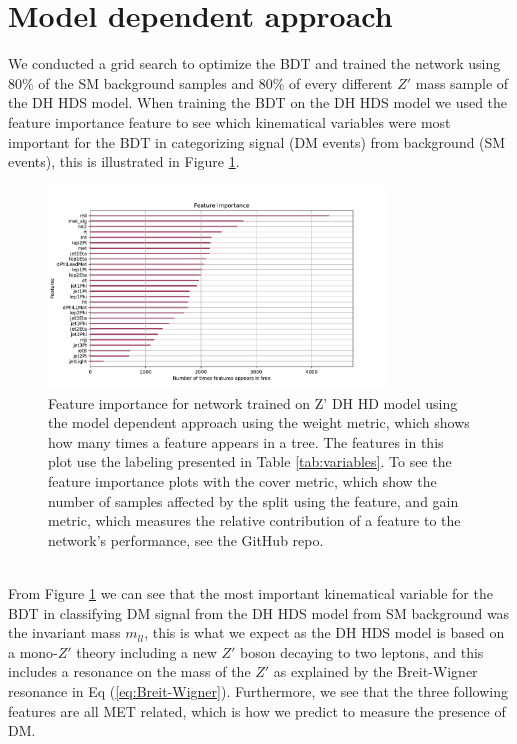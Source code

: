 \documentclass[12pt, a4paper]{book}
\begin{document}
\graphicspath{{../../../Plots/}}
\section{Model dependent approach}\label{sec:Walkthrough}
We conducted a grid search to optimize the BDT and trained the network using 80\% of the SM background samples and 80\% of every different $Z'$ mass sample of the DH HDS model. When training the BDT on the DH HDS model we used the feature importance feature to see which kinematical variables were most important for the BDT in 
categorizing signal (DM events) from background (SM events), this is illustrated in Figure \ref{fig:DH_HDS_feat}. 
\begin{figure}[!ht]
	\centering
      \includegraphics[width=0.8\textwidth]{XGBoost/DH_HDS/feature_importance/weight.pdf}
   \caption[Feature importance for network trained on Z' DH HD model using the model dependent approach]{Feature importance for network trained on Z' DH HD model using the model dependent approach using the weight metric, which shows how many times a feature appears in a tree. The features in this plot use the labeling presented in Table \ref{tab:variables}. 
   To see the feature importance plots with the cover metric, which show the number of samples affected by the split using the feature, and gain metric, which measures the relative contribution of a feature to the network's performance, see the GitHub repo.}\label{fig:DH_HDS_feat}
\end{figure}
\\From Figure \ref{fig:DH_HDS_feat} we can see that the most important kinematical variable for the BDT in classifying DM signal from the DH HDS model from SM background was the invariant mass $m_{ll}$, this is what we expect as the DH HDS model is based 
on a mono-$Z'$ theory including a new $Z'$ boson decaying to two leptons, and this includes a resonance on the mass of the $Z'$ as explained by the Breit-Wigner resonance in Eq (\ref{eq:Breit-Wigner}). Furthermore, we see that the three following features are all MET related, which is how we predict to measure the presence of DM. 
\end{document}
